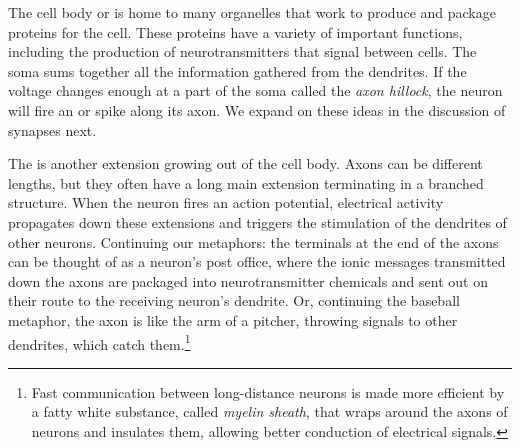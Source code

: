The cell body or  is home to many organelles that work to produce and package proteins for the cell. These proteins have a variety of important functions, including the production of neurotransmitters that signal between cells. The soma sums together all the information gathered from the dendrites. If the voltage changes enough at a part of the soma called the \emph{axon hillock}, the neuron will fire an  or spike along its axon. We expand on these ideas in the discussion of synapses next. 

The  is another extension growing out of the cell body. Axons can be different lengths, but they often have a long main extension terminating in a branched structure. When the neuron fires an action potential, electrical activity propagates down these extensions and triggers the stimulation of the dendrites of other neurons. Continuing our metaphors: the terminals at the end of the axons can be thought of as a neuron's post office, where the ionic messages transmitted down the axons are packaged into neurotransmitter chemicals and sent out on their route to the receiving neuron's dendrite. Or, continuing the baseball metaphor, the axon is like the arm of a pitcher, throwing signals to other dendrites, which catch them.\footnote{Fast communication between long-distance neurons is made more efficient by a fatty white substance, called \emph{myelin sheath}, that wraps around the axons of neurons and insulates them, allowing better conduction of electrical signals.}


